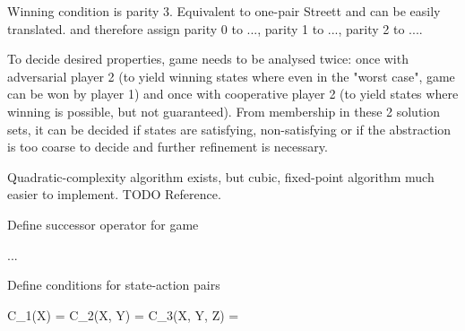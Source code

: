 Winning condition is parity 3.
Equivalent to one-pair Streett and can be easily translated.
 and therefore assign parity 0 to ..., parity 1 to ..., parity 2 to ....


    \startalgorithmic
            \DO
                \DO
                    \DO
        \ENDFUNCTION
    \stopalgorithmic
\stopbuffer

\startsubsection[title={Product Game Solution}]

    To decide desired properties, game needs to be analysed twice:
    once with adversarial player 2 (to yield winning states where even in the "worst case", game can be won by player 1) and once with cooperative player 2 (to yield states where winning is possible, but not guaranteed).
    From membership in these 2 solution sets, it can be decided if states are satisfying, non-satisfying or if the abstraction is too coarse to decide and further refinement is necessary.

    Quadratic-complexity algorithm exists, but cubic, fixed-point algorithm much easier to implement.
    TODO Reference.

    Define successor operator for game

    \startformula
        ...
    \stopformula

    Define conditions for state-action pairs

    \startformula
        \startalign[n=2,align={right,left}]
            \NC C_1(X) =
            \NC {}
            \NR
            \NC C_2(X, Y) =
            \NC {}
            \NR
            \NC C_3(X, Y, Z) =
            \NC {}
            \NR
        \stopalign
    \stopformula


